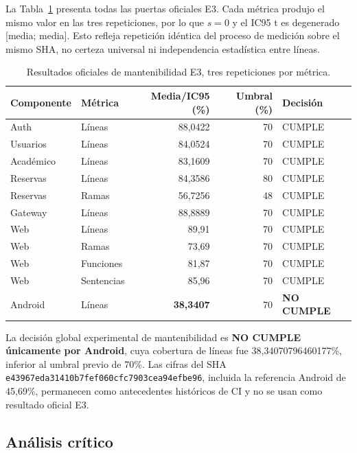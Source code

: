 La Tabla~\ref{tab:mantenibilidad-e3} presenta todas las puertas oficiales E3.
Cada métrica produjo el mismo valor en las tres repeticiones, por lo que
$s=0$ y el IC95 t es degenerado [media; media]. Esto refleja repetición idéntica
del proceso de medición sobre el mismo SHA, no certeza universal ni independencia
estadística entre líneas.

\begin{table}[ht]
  \centering
  \small
  \caption{Resultados oficiales de mantenibilidad E3, tres repeticiones por métrica.}
  \label{tab:mantenibilidad-e3}
  \begin{tabular}{|l|l|r|r|l|}
    \hline
    \textbf{Componente} & \textbf{Métrica} & \textbf{Media/IC95 (\%)} & \textbf{Umbral (\%)} & \textbf{Decisión} \\
    \hline
    Auth & Líneas & 88,0422 & 70 & CUMPLE \\
    Usuarios & Líneas & 84,0524 & 70 & CUMPLE \\
    Académico & Líneas & 83,1609 & 70 & CUMPLE \\
    Reservas & Líneas & 84,3586 & 80 & CUMPLE \\
    Reservas & Ramas & 56,7256 & 48 & CUMPLE \\
    Gateway & Líneas & 88,8889 & 70 & CUMPLE \\
    Web & Líneas & 89,91 & 70 & CUMPLE \\
    Web & Ramas & 73,69 & 70 & CUMPLE \\
    Web & Funciones & 81,87 & 70 & CUMPLE \\
    Web & Sentencias & 85,96 & 70 & CUMPLE \\
    Android & Líneas & \textbf{38,3407} & 70 & \textbf{NO CUMPLE} \\
    \hline
  \end{tabular}
\end{table}

La decisión global experimental de mantenibilidad es \textbf{NO CUMPLE
únicamente por Android}, cuya cobertura de líneas fue
38,34070796460177\%, inferior al umbral previo de 70\%. Las cifras del SHA
\texttt{e43967eda31410b7fef060cfc7903cea94efbe96}, incluida la referencia
Android de 45,69\%, permanecen como antecedentes históricos de CI y no se usan
como resultado oficial E3.

\subsection{Análisis crítico}
\label{subsec:analisis-critico-final}

